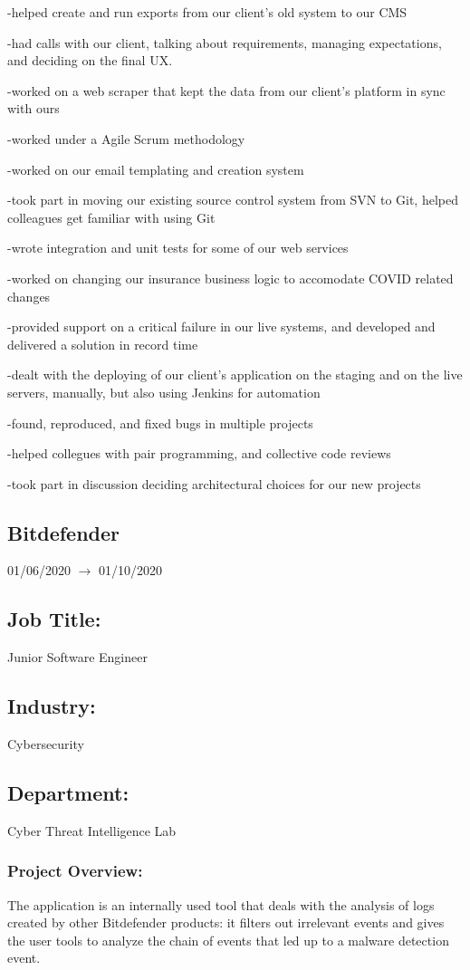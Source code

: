 \documentclass[a4paper,hidelinks,11pt]{article}
\begin{document}
-helped create and run exports from our client’s old system to our CMS

-had calls with our client, talking about requirements, managing expectations, and deciding on
the final UX.

-worked on a web scraper that kept the data from our client’s platform in sync with ours

-worked under a Agile Scrum methodology

-worked on our email templating and creation system

-took part in moving our existing source control system from SVN to Git, helped colleagues get
familiar with using Git

-wrote integration and unit tests for some of our web services

-worked on changing our insurance business logic to accomodate COVID related changes

-provided support on a critical failure in our live systems, and developed and delivered a solution
in record time

-dealt with the deploying of our client’s application on the staging and on the live servers,
manually, but also using Jenkins for automation

-found, reproduced, and fixed bugs in multiple projects

-helped collegues with pair programming, and collective code reviews

-took part in discussion deciding architectural choices for our new projects

\subsection{Bitdefender} 01/06/2020 $\rightarrow$ 01/10/2020
\subsection{Job Title:} Junior Software Engineer
\subsection{Industry:} Cybersecurity
\subsection{Department:} Cyber Threat Intelligence Lab
\subsubsection{Project Overview:}
The application is an internally used tool that deals with the analysis of logs created by other Bitdefender products: it filters out irrelevant events and gives the user tools to analyze the chain of events that led up to a malware detection event.
\end{document}
